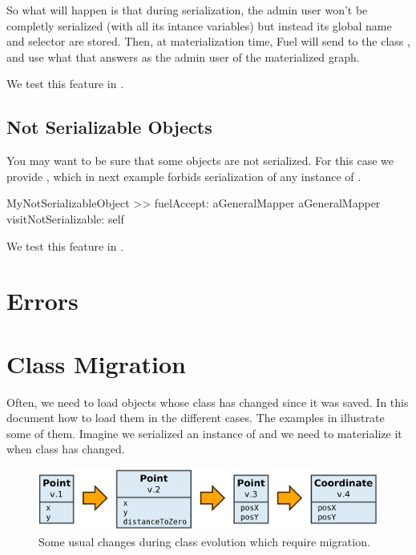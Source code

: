\documentclass[a4paper,10pt,twoside]{book}
\begin{document}
So what will happen is that during serialization, the admin user won't be completly serialized (with all its intance variables) but instead its global name and selector are stored. Then, at materialization time, Fuel will send  to the class , and use what that answers as the admin user of the materialized graph. 

We test this feature in .


\subsection{Not Serializable Objects}

You may want to be sure that some objects are not serialized. For this case we provide , which in next example forbids serialization of any instance of .

\begin{code}
MyNotSerializableObject >> fuelAccept: aGeneralMapper
    aGeneralMapper visitNotSerializable: self
\end{code}

We test this feature in .


\section{Errors}



\section{Class Migration}

Often, we need to load objects whose class has changed since it was saved. In this document how to load them in the different cases. The examples in  illustrate some of them. Imagine we serialized an instance of  and we need to materialize it when  class has changed.

\begin{figure}[t]\centering
        \includegraphics[width=\linewidth]{ClassChanges.png}
        \caption{Some usual changes during class evolution which require migration.}
\end{figure}
\end{document}
